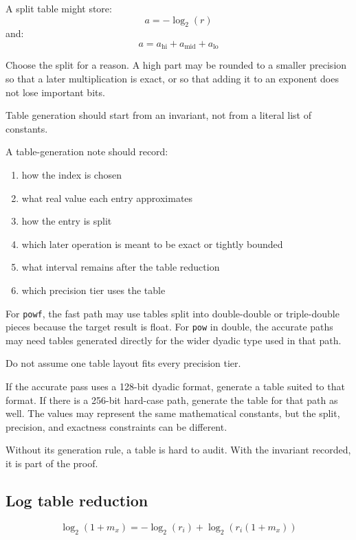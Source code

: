 \documentclass[manuscript, nonacm]{acmart}
\begin{document}
    A split table might store:
    \[ a = -\log_2(r) \]
    and:
    \[ a = a_\mathrm{hi} + a_\mathrm{mid} + a_\mathrm{lo} \]

    Choose the split for a reason. A high part may be rounded to a smaller
    precision so that a later multiplication is exact, or so that adding it to an
    exponent does not lose important bits.

    Table generation should start from an invariant, not from a literal list of
    constants.

    A table-generation note should record:

    \begin{enumerate}
        \item how the index is chosen
        \item what real value each entry approximates
        \item how the entry is split
        \item which later operation is meant to be exact or tightly bounded
        \item what interval remains after the table reduction
        \item which precision tier uses the table
    \end{enumerate}

    For \texttt{powf}, the fast path may use tables split into double-double or
    triple-double pieces because the target result is float. For \texttt{pow} in
    double, the accurate paths may need tables generated directly for the wider
    dyadic type used in that path.

    Do not assume one table layout fits every precision tier.

    If the accurate pass uses a 128-bit dyadic format, generate a table suited to
    that format. If there is a 256-bit hard-case path, generate the table for
    that path as well. The values may represent the same mathematical constants,
    but the split, precision, and exactness constraints can be different.

    Without its generation rule, a table is hard to audit. With the invariant
    recorded, it is part of the proof.

    \subsection{Log table reduction}

    \[ \log_2(1 + m_x) = -\log_2(r_i) + \log_2(r_i(1 + m_x)) \]
\end{document}
